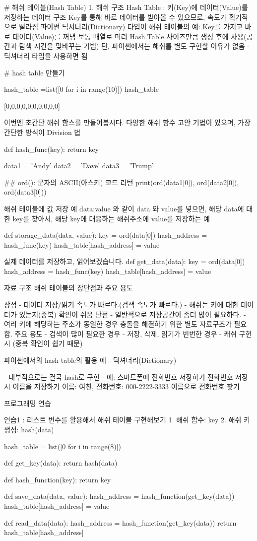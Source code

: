 # 해쉬 테이블(Hash Table)
1. 해쉬 구조
Hash Table : 키(Key)에 데이터(Value)를 저장하는 데이터 구조
Key를 통해 바로 데이터를 받아올 수 있으므로, 속도가 획기적으로 빨라짐
파이썬 딕셔너리(Dictionary) 타입이 해쉬 테이블의 예: Key를 가지고 바로 데이터(Value)를 꺼냄
보통 배열로 미리 Hash Table 사이즈만큼 생성 후에 사용(공간과 탐색 시간을 맞바꾸는 기법)
단, 파이썬에서는 해쉬를 별도 구현할 이유가 없음 - 딕셔너리 타입을 사용하면 됨

# hash table 만들기

hash_table =list([0 for i in range(10)])
hash_table

[0,0,0,0,0,0,0,0,0,0]

이번엔 초간단 해쉬 함스를 만들어봅시다.
다양한 해쉬 함수 고안 기법이 있으며, 가장 간단한 방식이 Division 법

def hash_func(key):
	return key %
	
data1 = 'Andy'
data2 = 'Dave'
data3 = 'Trump'

## ord(): 문자의 ASCII(아스키) 코드 리턴
print(ord(data1[0]), ord(data2[0]), ord(data3[0]))

해쉬 테이블에 값 저장 예
data:value 와 같이 data 와 value를 넣으면, 해당 data에 대한 key를 찾아서, 해당 key에 대응하는 해쉬주소에 value를 저장하는 예

def storage_data(data, value):
key = ord(data[0])
hash_address = hash_func(key)
hash_table[hash_address] = value

실제 데이터를 저장하고, 읽어보겠습니다.
def get_data(data):
  key = ord(data[0])
  hash_address = hash_func(key)
  hash_table[hash_address] = value
  
자료 구조 해쉬 테이블의 장단점과 주요 용도

장점
- 데이터 저장/읽기 속도가 빠르다.(검색 속도가 빠르다.)
- 해쉬는 키에 대한 데이터가 있는지(중복) 확인이 쉬움
단점
- 일반적으로 저장공간이 좀더 많이 필요하다.
- 여러 키에 해당하는 주소가 동일한 경우 충돌을 해결하기 위한 별도 자료구조가 필요함.
주요 용도
- 검색이 많이 필요한 경우
- 저장, 삭제, 읽기가 빈번한 경우
- 캐쉬 구현시 (중복 확인이 쉽기 때문)

파이썬에서의 hash table의 활용 예 - 딕셔너리(Dictionary)

- 내부적으로는 결국 hash로 구현
- 예: 스마트폰에 전화번호 저장하기
	전화번호 저장시 이름을 저장하기
	이름: 여친, 전화번호: 000-2222-3333
	이름으로 전화번호 찾기
	
	
  프로그래밍 연습
  
  연습1 : 리스트 변수를 활용해서 해쉬 테이블 구현해보기
  1. 해쉬 함수: key %
  2. 해쉬 키 생성: hash(data)
  
  hash_table = list([0 for i in range(8)])
  
  def get_key(data):
	return hash(data)
	
  def hash_function(key):
    return key %
	
  def save_data(data, value):
	hash_address = hash_function(get_key(data))
	hash_table[hash_address] = value
	
  def read_data(data):
    hash_address = hash_function(get_key(data))
	return hash_table[hash_address]
	

  

  
  
  